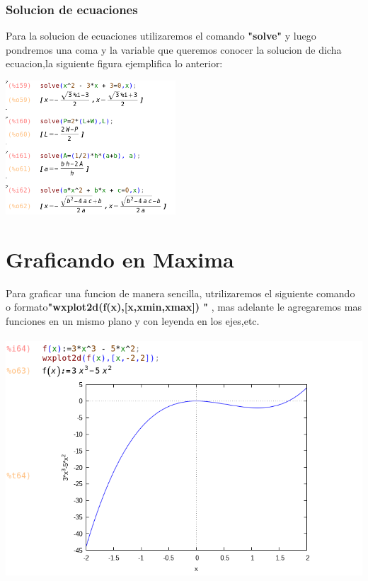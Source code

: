 \documentclass{article}
\begin{document}
\subsubsection{Solucion de ecuaciones}

Para la solucion de ecuaciones utilizaremos el comando \textbf{"solve" }y luego pondremos una coma y la variable que queremos conocer la solucion de dicha ecuacion,la siguiente figura ejemplifica lo anterior:


\begin{center}
\includegraphics[height=5cm]{fto18.png}
\end{center}


\section{Graficando en Maxima}

Para graficar una funcion de manera sencilla, utrilizaremos el siguiente comando o formato\textbf{"wxplot2d(f(x),[x,xmin,xmax]) " 
}, mas adelante le agregaremos mas funciones en un mismo plano y con leyenda en los ejes,etc.

\begin{center}
\includegraphics[height=9cm]{fto19.png}
\end{center}
\end{document}
